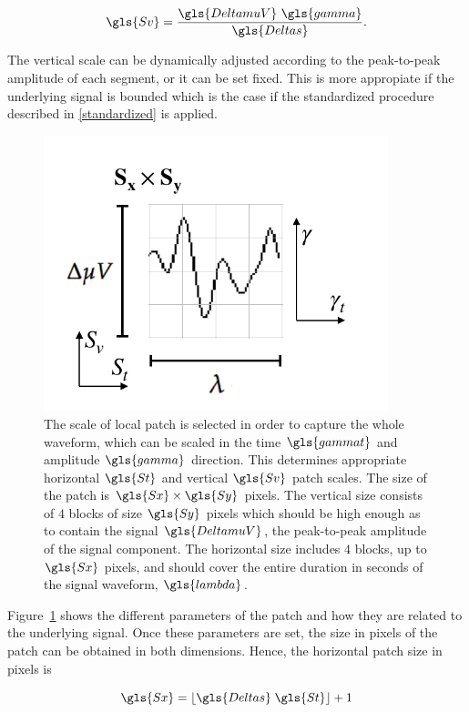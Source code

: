 \begin{equation}
\gls{Sv} = \frac{\gls{DeltamuV} \ \gls{gamma}}{\gls{Deltas}}.
\label{eq:verticalpatchscale}
\end{equation}

The vertical scale can be dynamically adjusted according to the peak-to-peak amplitude of each segment, or it can be set fixed.  This is more appropiate if the underlying signal is bounded which is the case if the standardized procedure described in \ref{standardized} is applied.

\begin{figure}[h!]
\centering
\includegraphics[width=10cm]{images/patchgeometry.pdf}
\caption[Patch Geometry]{The scale of local patch is selected in order to capture the whole waveform, which can be scaled in the time $\gls{gammat}$ and amplitude $\gls{gamma}$ direction.  This determines appropriate horizontal $\gls{St}$ and vertical $\gls{Sv}$ patch scales.  The size of the patch is $\gls{Sx} \times \gls{Sy}$ pixels. The vertical size consists of $4$ blocks of size $\gls{Sy}$ pixels which should be high enough as to contain the signal $\gls{DeltamuV}$, the peak-to-peak amplitude of the signal component. The horizontal size includes $4$ blocks, up to $\gls{Sx}$ pixels, and should cover the entire duration in seconds of the signal waveform, $\gls{lambda}$.   }
\label{fig:patchgeometry}
\end{figure}

Figure~\ref{fig:patchgeometry} shows the different parameters of the patch and how they are related to the underlying signal. Once these parameters are set, the size in pixels of the patch can be obtained in both dimensions.  Hence, the horizontal patch size in pixels is

\begin{equation}
\gls{Sx} = \lfloor \gls{Deltas} \; \gls{St} \rfloor + 1
\label{eq:sx}
\end{equation}

